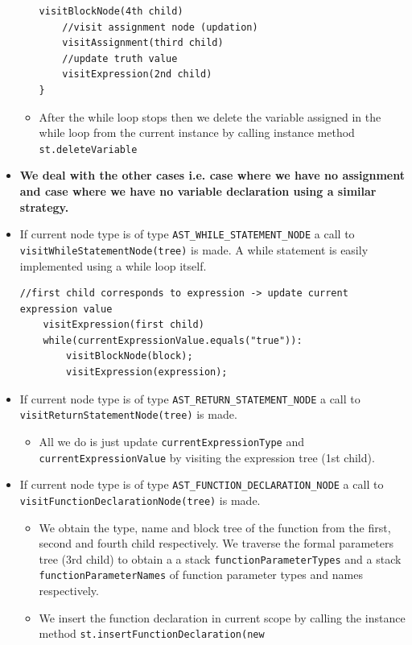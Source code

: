 \begin{itemize}
\begin{itemize}
\begin{lstlisting}[caption=\emph{for(declaration;expression;assignment)\{...\}}]
    visitBlockNode(4th child)
    //visit assignment node (updation)
    visitAssignment(third child)
    //update truth value
    visitExpression(2nd child)
}
	      	      \end{lstlisting}
	      	\item After the while loop stops then we delete the variable assigned in the while loop from the current instance by calling instance method \verb!st.deleteVariable!
	      \end{itemize}
	\item \textbf{We deal with the other cases i.e. case where we have no assignment and case where we have no variable declaration using a similar strategy.}
	      	      	      
	\item If current node type is of type \verb!AST_WHILE_STATEMENT_NODE! a call to \verb!visitWhileStatementNode(tree)! is made. A while statement is easily implemented using a while loop itself.
	      \begin{lstlisting}[caption=encoding of while loop]
    //first child corresponds to expression -> update current expression value
    visitExpression(first child)
    while(currentExpressionValue.equals("true")):
        visitBlockNode(block);
        visitExpression(expression);
	      \end{lstlisting}
	\item If current node type is of type \verb!AST_RETURN_STATEMENT_NODE! a call to \verb!visitReturnStatementNode(tree)! is made.
	      \begin{itemize}
	      	\item All we do is just update \verb!currentExpressionType! and \verb!currentExpressionValue! by visiting the expression tree (1st child).
	      \end{itemize}
	\item If current node type is of type \verb!AST_FUNCTION_DECLARATION_NODE! a call to \verb!visitFunctionDeclarationNode(tree)! is made.
	      \begin{itemize}
	      	\item We obtain the type, name and block tree of the function from the first, second and fourth child respectively. We traverse the formal parameters tree (3rd child) to obtain a a stack \verb!functionParameterTypes! and a stack \verb!functionParameterNames! of function parameter types and names respectively.
	      	\item 
	      	      We insert the function declaration in current scope by calling the instance method \verb!st.insertFunctionDeclaration(new!

\end{itemize}
\end{itemize}

